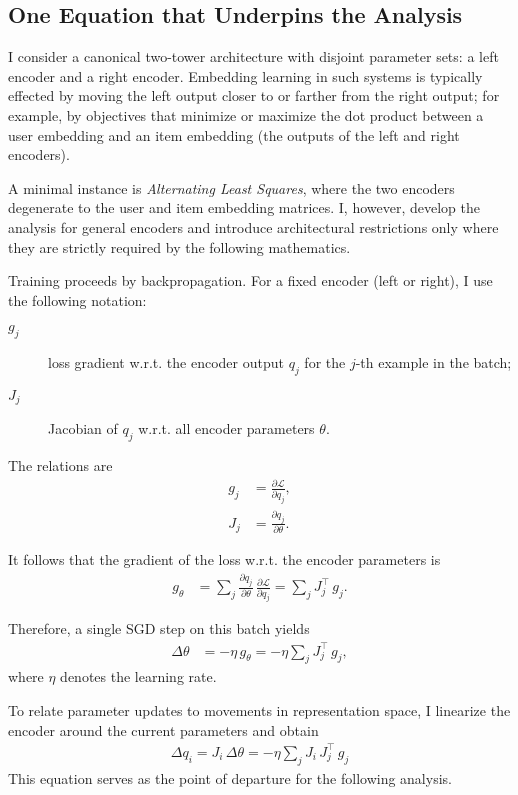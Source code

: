 \subsection{One Equation that Underpins the Analysis}

I consider a canonical two-tower architecture with disjoint parameter sets: a left encoder and a right encoder. Embedding learning in such systems is typically effected by moving the left output closer to or farther from the right output; for example, by objectives that minimize or maximize the dot product between a user embedding and an item embedding (the outputs of the left and right encoders).

A minimal instance is \emph{Alternating Least Squares}, where the two encoders degenerate to the user and item embedding matrices. I, however, develop the analysis for general encoders and introduce architectural restrictions only where they are strictly required by the following mathematics.

Training proceeds by backpropagation. For a fixed encoder (left or right), I use the following notation:

\begin{description}
\item[$g_j$] loss gradient w.r.t. the encoder output $q_j$ for the $j$-th example in the batch;
\item[$J_j$] Jacobian of $q_j$ w.r.t. all encoder parameters $\theta$.
\end{description}

The relations are
\begin{align}
g_j &= \frac{\partial \mathcal{L}}{\partial q_j},\\
J_j &= \frac{\partial q_j}{\partial \theta}.
\end{align}

It follows that the gradient of the loss w.r.t. the encoder parameters is
\begin{align}
g_{\theta} &= \sum_{j} \frac{\partial q_j}{\partial \theta}\, \frac{\partial \mathcal{L}}{\partial q_j}
= \sum_{j} J_{j}^{\!\top}\, g_{j}.
\end{align}

Therefore, a single SGD step on this batch yields
\begin{align}
\Delta \theta &= -\eta\,g_{\theta}
= -\eta \sum_{j} J_{j}^{\!\top}\, g_{j},
\end{align}
where $\eta$ denotes the learning rate.

To relate parameter updates to movements in representation space, I linearize the encoder around the current parameters and obtain
\begin{align}
\boxed{\; \Delta q_{i} = J_{i}\,\Delta\theta = -\eta \sum_{j} J_{i}\,J_{j}^{\!\top}\,g_{j} \;}\label{eq:starting-formula}
\end{align}
This equation serves as the point of departure for the following analysis.
